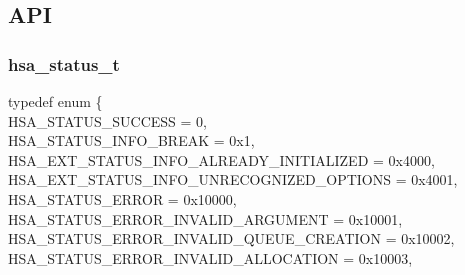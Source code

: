 \documentclass[final]{book}
\newcommand{\reftyp}[1]{#1}
\newcommand{\refenu}[1]{\reftyp{#1}}
\newenvironment{mylongtable}{\rowcolors{0}{lightgray}{lightgray}\longtable} {
\endlongtable}
\begin{document}
\subsection{API}
\makeatletter{}

\subsubsection{hsa_\-status_\-t}
\vspace{-5.5mm}\begin{mylongtable}{@{}p{\textwidth}}
\rule{0pt}{3ex}typedef enum \{\\\hspace{1.7em}\hypertarget{group__status_1ggad755322e7ff95456520e8abdbe90d225ae382ea0c9c05cce5a60d0317375159cc}{\refenu{HSA_\-STATUS_\-SUCCESS}} = 0,\\
\hspace{1.7em}\hypertarget{group__status_1ggad755322e7ff95456520e8abdbe90d225a86c476121ca787ff75f6a4676507b221}{\refenu{HSA_\-STATUS_\-INFO_\-BREAK}} = 0x1,\\
\hspace{1.7em}\hypertarget{group__status_1ggad755322e7ff95456520e8abdbe90d225a0882e3ebb9cc8a5c6033c43ee7a6d898}{\refenu{HSA_\-EXT_\-STATUS_\-INFO_\-ALREADY_\-INITIALIZED}} = 0x4000,\\
\hspace{1.7em}\hypertarget{group__status_1ggad755322e7ff95456520e8abdbe90d225a60343279bea68766b037297915b5f903}{\refenu{HSA_\-EXT_\-STATUS_\-INFO_\-UNRECOGNIZED_\-OPTIONS}} = 0x4001,\\
\hspace{1.7em}\hypertarget{group__status_1ggad755322e7ff95456520e8abdbe90d225a60edf4d82e4703ff750ea38d619fea88}{\refenu{HSA_\-STATUS_\-ERROR}} = 0x10000,\\
\hspace{1.7em}\hypertarget{group__status_1ggad755322e7ff95456520e8abdbe90d225ac7d3651f75107d2a6a8ba3b25683c030}{\refenu{HSA_\-STATUS_\-ERROR_\-INVALID_\-ARGUMENT}} = 0x10001,\\
\hspace{1.7em}\hypertarget{group__status_1ggad755322e7ff95456520e8abdbe90d225a7b27f50e23a776b496b8b4707f21ccad}{\refenu{HSA_\-STATUS_\-ERROR_\-INVALID_\-QUEUE_\-CREATION}} = 0x10002,\\
\hspace{1.7em}\hypertarget{group__status_1ggad755322e7ff95456520e8abdbe90d225ac818189ff640d38ce13558e72daddb75}{\refenu{HSA_\-STATUS_\-ERROR_\-INVALID_\-ALLOCATION}} = 0x10003,\\

\end{mylongtable}
\end{document}
